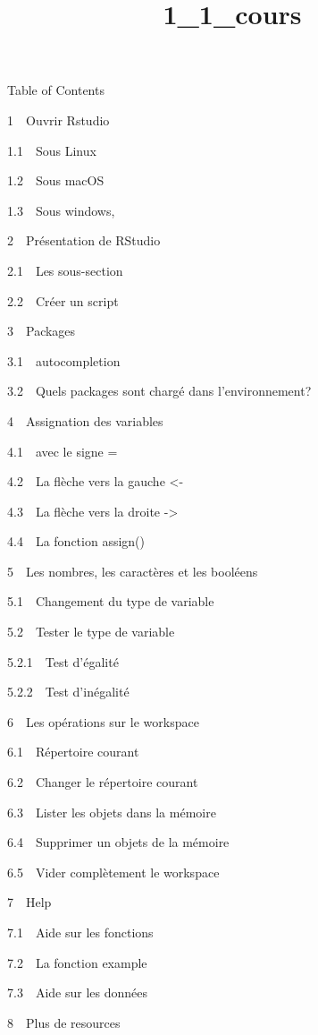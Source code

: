 \documentclass[11pt]{article}
\title{1\_1\_cours}
\begin{document}
    
    
    \maketitle
    
    

    
    Table of Contents{}

{{1~~}Ouvrir Rstudio}

{{1.1~~}Sous Linux}

{{1.2~~}Sous macOS}

{{1.3~~}Sous windows,}

{{2~~}Présentation de RStudio}

{{2.1~~}Les sous-section}

{{2.2~~}Créer un script}

{{3~~}Packages}

{{3.1~~}autocompletion}

{{3.2~~}Quels packages sont chargé dans l'environnement?}

{{4~~}Assignation des variables}

{{4.1~~}avec le signe =}

{{4.2~~}La flèche vers la gauche \textless{}-}

{{4.3~~}La flèche vers la droite -\textgreater{}}

{{4.4~~}La fonction assign()}

{{5~~}Les nombres, les caractères et les booléens}

{{5.1~~}Changement du type de variable}

{{5.2~~}Tester le type de variable}

{{5.2.1~~}Test d'égalité}

{{5.2.2~~}Test d'inégalité}

{{6~~}Les opérations sur le workspace}

{{6.1~~}Répertoire courant}

{{6.2~~}Changer le répertoire courant}

{{6.3~~}Lister les objets dans la mémoire}

{{6.4~~}Supprimer un objets de la mémoire}

{{6.5~~}Vider complètement le workspace}

{{7~~}Help}

{{7.1~~}Aide sur les fonctions}

{{7.2~~}La fonction example}

{{7.3~~}Aide sur les données}

{{8~~}Plus de resources}
\end{document}
